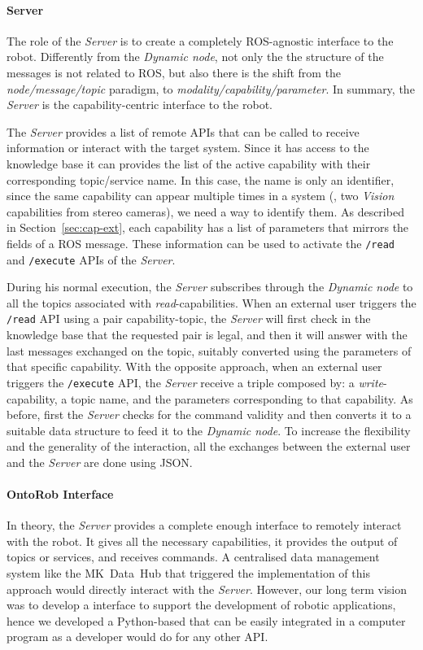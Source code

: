 \paragraph{Server} The role of the \textit{Server} is to create a completely ROS-agnostic interface to the robot. Differently from the \textit{Dynamic node}, not only the the structure of the messages is not related to ROS, but also there is the shift from the \textit{node/message/topic} paradigm, to \textit{modality/capability/parameter}. In summary, the \textit{Server} is the capability-centric interface to the robot.

The \textit{Server} provides a list of remote APIs that can be called to receive information or interact with the target system. Since it has access to the knowledge base it can provides the list of the active capability with their corresponding topic/service name. In this case, the name is only an identifier, since the same capability can appear multiple times in a system (\eg, two \textit{Vision} capabilities from stereo cameras), we need a way to identify them. As described in Section~\ref{sec:cap-ext}, each capability has a list of parameters that mirrors the fields of a ROS message. These information can be used to activate the \texttt{/read} and \texttt{/execute} APIs of the \textit{Server}.

During his normal execution, the \textit{Server} subscribes through the \textit{Dynamic node} to all the topics associated with \textit{read}-capabilities. When an external user triggers the \texttt{/read} API using a pair capability-topic, the \textit{Server} will first check in the knowledge base that the requested pair is legal, and then it will answer with the last messages exchanged on the topic, suitably converted using the parameters of that specific capability. With the opposite approach, when an external user triggers the \texttt{/execute} API, the \textit{Server} receive a triple composed by: a \textit{write}-capability, a topic name, and the parameters corresponding to that capability. As before, first the \textit{Server} checks for the command validity and then converts it to a suitable data structure to feed it to the \textit{Dynamic node}. To increase the flexibility and the generality of the interaction, all the exchanges between the external user and the \textit{Server} are done using JSON.

\paragraph{OntoRob Interface} In theory, the \textit{Server} provides a complete enough interface to remotely interact with the robot. It gives all the necessary capabilities, it provides the output of topics or services, and receives commands. A centralised data management system like the MK~Data~Hub that triggered the implementation of this approach would directly interact with the \textit{Server}. However, our long term vision was to develop a interface to support the development of robotic applications, hence we developed a Python-based that can be easily integrated in a computer program as a developer would do for any other API.

